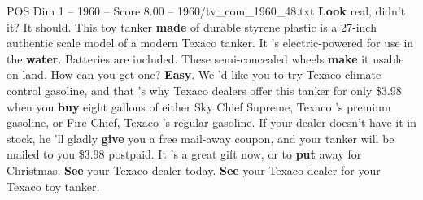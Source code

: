 \begin{textsample}{POS Dim 1 – 1960 – Score 8.00 – 1960/tv\_com\_1960\_48.txt}  \label{ex:f1_pos_024}
\textbf{Look} real, didn't it?
It should.
This toy tanker \textbf{made} of durable styrene plastic is a 27-inch authentic scale model of a modern Texaco tanker.
It 's electric-powered for use in the \textbf{water}.
Batteries are included.
These semi-concealed wheels \textbf{make} it usable on land.
How can you get one? \textbf{Easy}.
We 'd like you to try Texaco climate control gasoline, and that 's why Texaco dealers offer this tanker for only \$3.98 when you \textbf{buy} eight gallons of either Sky Chief Supreme, Texaco 's premium gasoline, or Fire Chief, Texaco 's regular gasoline.
If your dealer doesn't have it in stock, he 'll gladly \textbf{give} you a free mail-away coupon, and your tanker will be mailed to you \$3.98 postpaid.
It 's a great gift now, or to \textbf{put} away for Christmas. \textbf{See} your Texaco dealer today. \textbf{See} your Texaco dealer for your Texaco toy tanker.

\end{textsample}
